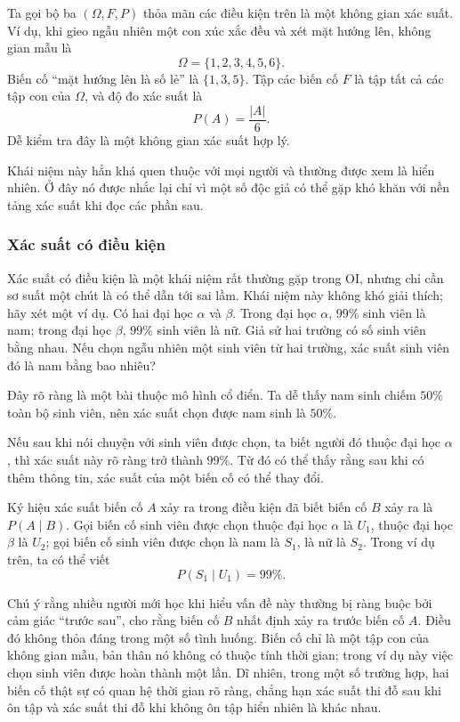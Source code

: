 \documentclass[11pt]{article}
\begin{document}
Ta gọi bộ ba \((\Omega,F,P)\) thỏa mãn các điều kiện trên là một không gian
xác suất. Ví dụ, khi gieo ngẫu nhiên một con xúc xắc đều và xét mặt hướng
lên, không gian mẫu là
\[
  \Omega=\{1,2,3,4,5,6\}.
\]
Biến cố ``mặt hướng lên là số lẻ'' là \(\{1,3,5\}\). Tập các biến cố \(F\)
là tập tất cả các tập con của \(\Omega\), và độ đo xác suất là
\[
  P(A)=\frac{|A|}{6}.
\]
Dễ kiểm tra đây là một không gian xác suất hợp lý.

Khái niệm này hẳn khá quen thuộc với mọi người và thường được xem là hiển
nhiên. Ở đây nó được nhắc lại chỉ vì một số độc giả có thể gặp khó khăn với
nền tảng xác suất khi đọc các phần sau.

\subsubsection{Xác suất có điều kiện}

Xác suất có điều kiện là một khái niệm rất thường gặp trong OI, nhưng chỉ
cần sơ suất một chút là có thể dẫn tới sai lầm. Khái niệm này không khó giải
thích; hãy xét một ví dụ. Có hai đại học \(\alpha\) và \(\beta\). Trong đại
học \(\alpha\), \(99\%\) sinh viên là nam; trong đại học \(\beta\), \(99\%\)
sinh viên là nữ. Giả sử hai trường có số sinh viên bằng nhau. Nếu chọn ngẫu
nhiên một sinh viên từ hai trường, xác suất sinh viên đó là nam bằng bao
nhiêu?

Đây rõ ràng là một bài thuộc mô hình cổ điển. Ta dễ thấy nam sinh chiếm
\(50\%\) toàn bộ sinh viên, nên xác suất chọn được nam sinh là \(50\%\).

Nếu sau khi nói chuyện với sinh viên được chọn, ta biết người đó thuộc đại
học \(\alpha\), thì xác suất này rõ ràng trở thành \(99\%\). Từ đó có thể
thấy rằng sau khi có thêm thông tin, xác suất của một biến cố có thể thay
đổi.

Ký hiệu xác suất biến cố \(A\) xảy ra trong điều kiện đã biết biến cố \(B\)
xảy ra là \(P(A\mid B)\). Gọi biến cố sinh viên được chọn thuộc đại học
\(\alpha\) là \(U_1\), thuộc đại học \(\beta\) là \(U_2\); gọi biến cố sinh
viên được chọn là nam là \(S_1\), là nữ là \(S_2\). Trong ví dụ trên, ta có
thể viết
\[
  P(S_1\mid U_1)=99\%.
\]

Chú ý rằng nhiều người mới học khi hiểu vấn đề này thường bị ràng buộc bởi
cảm giác ``trước sau'', cho rằng biến cố \(B\) nhất định xảy ra trước biến cố
\(A\). Điều đó không thỏa đáng trong một số tình huống. Biến cố chỉ là một
tập con của không gian mẫu, bản thân nó không có thuộc tính thời gian; trong
ví dụ này việc chọn sinh viên được hoàn thành một lần. Dĩ nhiên, trong một số
trường hợp, hai biến cố thật sự có quan hệ thời gian rõ ràng, chẳng hạn xác
suất thi đỗ sau khi ôn tập và xác suất thi đỗ khi không ôn tập hiển nhiên là
khác nhau.
\end{document}
